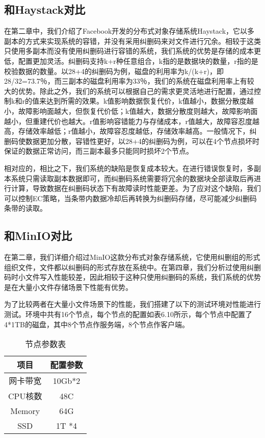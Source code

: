 \subsection{和Haystack对比}%
在第二章中，我们介绍了Facebook开发的分布式对象存储系统Haystack，它以多副本的方式来实现系统的容错，并没有采用纠删码来对文件进行冗余。相较于这类只使用多副本而没有使用纠删码进行容错的系统，我们系统的优势是存储的成本更低，配置更加灵活。纠删码支持k+r种任意组合，k指的是数据块的数量，r指的是校验数据的数量。以28+4的纠删码为例，磁盘的利用率为k/(k+r)，即28/32=73.7％，而三副本的磁盘利用率为33％，我们的系统在磁盘利用率上有较大的优势。除此之外，我们的系统可以根据自己的需求更灵活地进行配置，通过控制k和r的值来达到所需的效果。k值影响数据恢复代价，k值越小，数据分散度越小，故障影响面越大，但恢复代价低；k值越大，数据分散度则越大，故障影响面越小，但重建代价也越大。r值影响容错能力与存储成本，r值越大，故障容忍度越高，存储效率越低；r值越小，故障容忍度越低，存储效率越高。一般情况下，纠删码使数据更加分散，容错性更好，以28+4的纠删码为例，可以在4个节点损坏时保证的数据正常访问，而三副本最多只能同时损坏2个节点。

相对应的，相比之下，我们系统的缺陷是恢复成本较大。在进行错误恢复时，多副本系统只需读取副本数据即可，而纠删码系统需要将冗余的数据块全部读取后再进行计算，导致数据在纠删码状态下有故障读时性能更差。为了应对这个缺陷，我们可以控制EC策略，当条带内数据冷却后再转换为纠删码存储，尽可能减少纠删码条带的读取。

\subsection{和MinIO对比}%
在第二章，我们详细介绍过MinIO这款分布式对象存储系统，它使用纠删组的形式组织文件，文件都以纠删码的形式存放在系统中。在第四章，我们分析过使用纠删码时小文件写入性能较差，因此相较于这种只使用纠删码的系统，我们系统的优势是在大量小文件存储场景下性能有优势。

为了比较两者在大量小文件场景下的性能，我们搭建了以下的测试环境对性能进行测试。环境中共有16个节点，每个节点的配置如表6.10所示，每个节点中配置了4*1TB的磁盘，其中8个节点作服务端，8个节点作客户端。

\begin{table}[h]
    \centering
    \caption{节点参数表}
    \begin{tabular}{cc}
      \toprule
      项目   & 配置参数   \\
      \midrule
      网卡带宽 & 10Gb*2  \\
      CPU核数  & 48C     \\
      Memory  & 64G      \\
      SSD     & 1T *4   \\
      \bottomrule
    \end{tabular}
\end{table}

